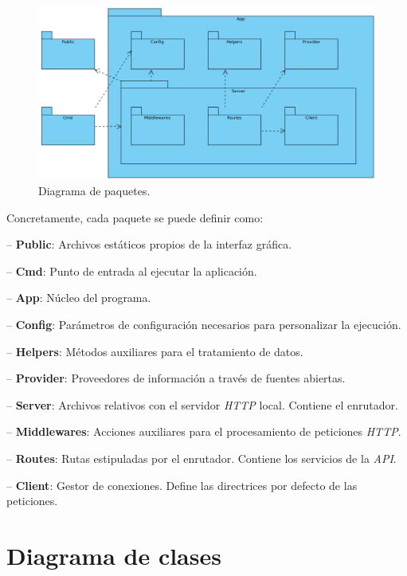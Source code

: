 \begin{figure}[H]
    \centering
    \includegraphics[width=15cm]{img/tables/20_Packages-Diagram.png}
    \caption{Diagrama de paquetes.}
    \label{fig:packagesdiagram}
\end{figure}
\newpage

Concretamente, cada paquete se puede definir como:\n

-- \textbf{Public}: Archivos estáticos propios de la interfaz gráfica.\sn

-- \textbf{Cmd}: Punto de entrada al ejecutar la aplicación.\sn

-- \textbf{App}: Núcleo del programa.\sn

-- \textbf{Config}: Parámetros de configuración necesarios para personalizar la ejecución.\sn

-- \textbf{Helpers}: Métodos auxiliares para el tratamiento de datos.\sn

-- \textbf{Provider}: Proveedores de información a través de fuentes abiertas.\sn

-- \textbf{Server}: Archivos relativos con el servidor \textit{HTTP} local. Contiene el enrutador.\sn

-- \textbf{Middlewares}: Acciones auxiliares para el procesamiento de peticiones \textit{HTTP}.\sn

-- \textbf{Routes}: Rutas estipuladas por el enrutador. Contiene los servicios de la \textit{API}.\sn

-- \textbf{Client}: Gestor de conexiones. Define las directrices por defecto de las peticiones.\n


\section{Diagrama de clases} \label{sec:classdiagram}

